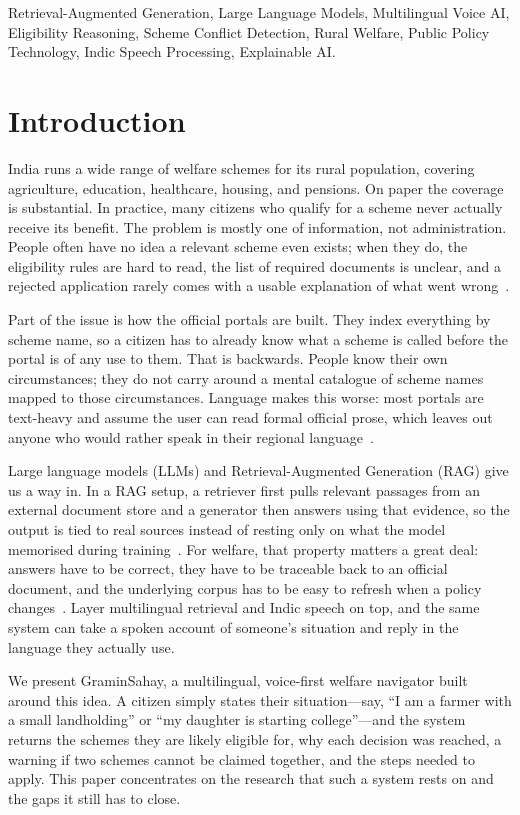 \documentclass[conference]{IEEEtran}
\begin{document}
\begin{IEEEkeywords}
Retrieval-Augmented Generation, Large Language Models, Multilingual Voice AI, Eligibility Reasoning, Scheme Conflict Detection, Rural Welfare, Public Policy Technology, Indic Speech Processing, Explainable AI.
\end{IEEEkeywords}

\section{Introduction}
India runs a wide range of welfare schemes for its rural population, covering agriculture, education, healthcare, housing, and pensions. On paper the coverage is substantial. In practice, many citizens who qualify for a scheme never actually receive its benefit. The problem is mostly one of information, not administration. People often have no idea a relevant scheme even exists; when they do, the eligibility rules are hard to read, the list of required documents is unclear, and a rejected application rarely comes with a usable explanation of what went wrong~\cite{zhang2026llm}.

Part of the issue is how the official portals are built. They index everything by scheme name, so a citizen has to already know what a scheme is called before the portal is of any use to them. That is backwards. People know their own circumstances; they do not carry around a mental catalogue of scheme names mapped to those circumstances. Language makes this worse: most portals are text-heavy and assume the user can read formal official prose, which leaves out anyone who would rather speak in their regional language~\cite{zhang2026llm}.

Large language models (LLMs) and Retrieval-Augmented Generation (RAG) give us a way in. In a RAG setup, a retriever first pulls relevant passages from an external document store and a generator then answers using that evidence, so the output is tied to real sources instead of resting only on what the model memorised during training~\cite{lewis2020rag}. For welfare, that property matters a great deal: answers have to be correct, they have to be traceable back to an official document, and the underlying corpus has to be easy to refresh when a policy changes~\cite{lewis2020rag}. Layer multilingual retrieval and Indic speech on top, and the same system can take a spoken account of someone's situation and reply in the language they actually use.

We present GraminSahay, a multilingual, voice-first welfare navigator built around this idea. A citizen simply states their situation---say, ``I am a farmer with a small landholding'' or ``my daughter is starting college''---and the system returns the schemes they are likely eligible for, why each decision was reached, a warning if two schemes cannot be claimed together, and the steps needed to apply. This paper concentrates on the research that such a system rests on and the gaps it still has to close.
\end{document}
